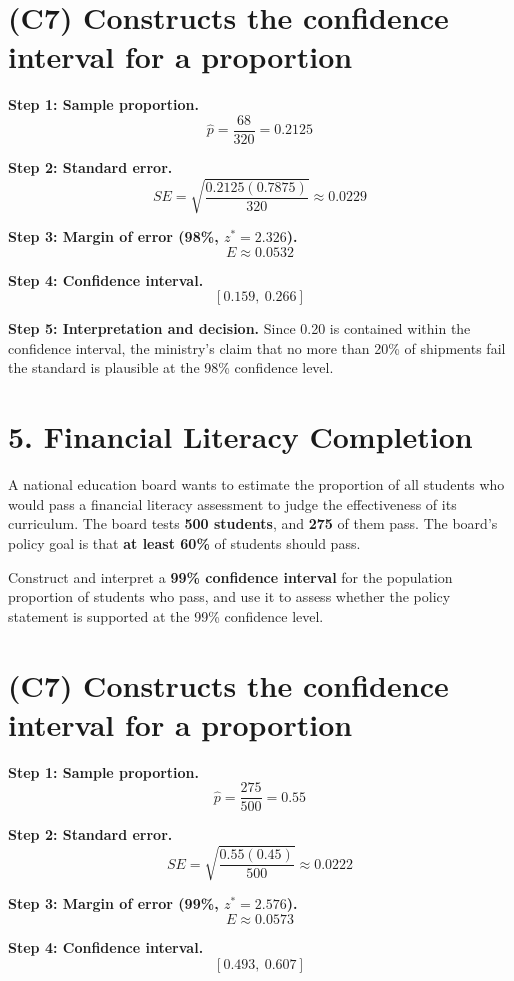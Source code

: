 	\section{(C7) Constructs the confidence interval for a proportion}
	
	\textbf{Step 1: Sample proportion.}
	\[
	\hat{p} = \frac{68}{320} = 0.2125
	\]
	
	\textbf{Step 2: Standard error.}
	\[
	SE = \sqrt{\frac{0.2125(0.7875)}{320}} \approx 0.0229
	\]
	
	\textbf{Step 3: Margin of error (98\%, \(z^* = 2.326\)).}
	\[
	E \approx 0.0532
	\]
	
	\textbf{Step 4: Confidence interval.}
	\[
	[0.159,\ 0.266]
	\]
	
	\textbf{Step 5: Interpretation and decision.}
	Since 0.20 is contained within the confidence interval, the ministry’s claim that no more than 20\% of shipments fail the standard is plausible at the 98\% confidence level.
	
\section*{5. Financial Literacy Completion}

A national education board wants to estimate the proportion of all students who would pass a financial literacy assessment to judge the effectiveness of its curriculum. The board tests \textbf{500 students}, and \textbf{275} of them pass. The board’s policy goal is that \textbf{at least 60\%} of students should pass.

Construct and interpret a \textbf{99\% confidence interval} for the population proportion of students who pass, and use it to assess whether the policy statement is supported at the 99\% confidence level.
	
	\section{(C7) Constructs the confidence interval for a proportion}
	
	\textbf{Step 1: Sample proportion.}
	\[
	\hat{p} = \frac{275}{500} = 0.55
	\]
	
	\textbf{Step 2: Standard error.}
	\[
	SE = \sqrt{\frac{0.55(0.45)}{500}} \approx 0.0222
	\]
	
	\textbf{Step 3: Margin of error (99\%, \(z^* = 2.576\)).}
	\[
	E \approx 0.0573
	\]
	
	\textbf{Step 4: Confidence interval.}
	\[
	[0.493,\ 0.607]
	\]
	
